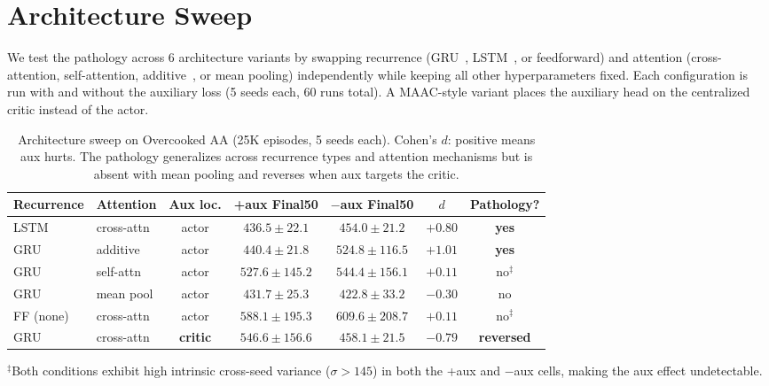 \documentclass{article}
\theoremstyle{plain}
\theoremstyle{definition}
\theoremstyle{remark}
\begin{document}
\section{Architecture Sweep}
\label{app:arch_sweep}

We test the pathology across 6 architecture variants by swapping recurrence
(GRU~\cite{cho2014gru}, LSTM~\cite{hochreiter1997lstm}, or feedforward) and
attention (cross-attention, self-attention, additive~\cite{bahdanau2015additive},
or mean pooling) independently while keeping all other hyperparameters fixed.
Each configuration is run with and without the auxiliary loss (5 seeds
each, 60 runs total). A MAAC-style variant places the auxiliary head on the
centralized critic instead of the actor.

\begin{table}[H]
\centering
\caption{Architecture sweep on Overcooked AA (25K episodes, 5 seeds each).
Cohen's $d$: positive means aux hurts. The pathology generalizes across
recurrence types and attention mechanisms but is absent with mean pooling
and reverses when aux targets the critic.}
\label{tab:arch_sweep}
\small
\setlength{\tabcolsep}{3pt}
\begin{tabular}{llccccc}
\toprule
\textbf{Recurrence} & \textbf{Attention} & \textbf{Aux loc.} & \textbf{+aux Final50} & \textbf{$-$aux Final50} & \textbf{$d$} & \textbf{Pathology?} \\
\midrule
LSTM & cross-attn & actor & $436.5 \pm 22.1$ & $454.0 \pm 21.2$ & $+0.80$ & \textbf{yes} \\
GRU & additive & actor & $440.4 \pm 21.8$ & $524.8 \pm 116.5$ & $+1.01$ & \textbf{yes} \\
GRU & self-attn & actor & $527.6 \pm 145.2$ & $544.4 \pm 156.1$ & $+0.11$ & no$^\ddagger$ \\
GRU & mean pool & actor & $431.7 \pm 25.3$ & $422.8 \pm 33.2$ & $-0.30$ & no \\
FF (none) & cross-attn & actor & $588.1 \pm 195.3$ & $609.6 \pm 208.7$ & $+0.11$ & no$^\ddagger$ \\
\midrule
GRU & cross-attn & \textbf{critic} & $546.6 \pm 156.6$ & $458.1 \pm 21.5$ & $-0.79$ & \textbf{reversed} \\
\bottomrule
\end{tabular}

\vspace{2pt}
{\footnotesize $^\ddagger$Both conditions exhibit high intrinsic cross-seed variance ($\sigma > 145$) in both the +aux and $-$aux cells, making the aux effect undetectable.}
\end{table}
\end{document}
